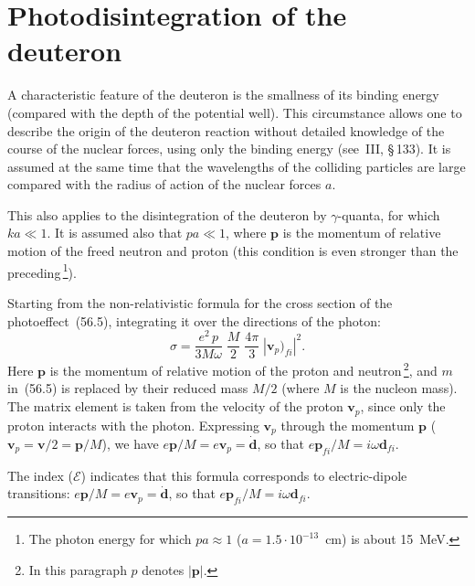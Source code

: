 \section{Photodisintegration of the deuteron}

A characteristic feature of the deuteron is the smallness of its binding energy (compared with the depth of the potential well). This circumstance allows one to describe the origin of the deuteron reaction without detailed knowledge of the course of the nuclear forces, using only the binding energy (see~III, \S\,133). It is assumed at the same time that the wavelengths of the colliding particles are large compared with the radius of action of the nuclear forces $a$.

This also applies to the disintegration of the deuteron by $\gamma$-quanta, for which $ka \ll 1$. It is assumed also that $pa \ll 1$, where $\mathbf{p}$ is the momentum of relative motion of the freed neutron and proton (this condition is even stronger than the preceding\,\footnote{The photon energy for which $pa \approx 1$ ($a = 1.5 \cdot 10^{-13}$~cm) is about 15~MeV.}).

Starting from the non-relativistic formula for the cross section of the photoeffect~(56.5), integrating it over the directions of the photon:
\begin{equation}
\sigma = \frac{e^2\,p}{3M\omega}\;\frac{M}{2}\;\frac{4\pi}{3}\;|\mathbf{v}_p)_{fi}|^2.
\tag{58.1}
\end{equation}
Here $\mathbf{p}$ is the momentum of relative motion of the proton and neutron\,\footnote{In this paragraph $p$ denotes $|\mathbf{p}|$.}, and $m$ in~(56.5) is replaced by their reduced mass $M/2$ (where $M$ is the nucleon mass). The matrix element is taken from the velocity of the proton $\mathbf{v}_p$, since only the proton interacts with the photon. Expressing $\mathbf{v}_p$ through the momentum $\mathbf{p}$ ($\mathbf{v}_p = \mathbf{v}/2 = \mathbf{p}/M$), we have $e\mathbf{p}/M = e\mathbf{v}_p = \dot{\mathbf{d}}$, so that $e\mathbf{p}_{fi}/M = i\omega\mathbf{d}_{fi}$.

The index ($\mathscr{E}$) indicates that this formula corresponds to electric-dipole transitions: $e\mathbf{p}/M = e\mathbf{v}_p = \dot{\mathbf{d}}$, so that $e\mathbf{p}_{fi}/M = i\omega\mathbf{d}_{fi}$.


